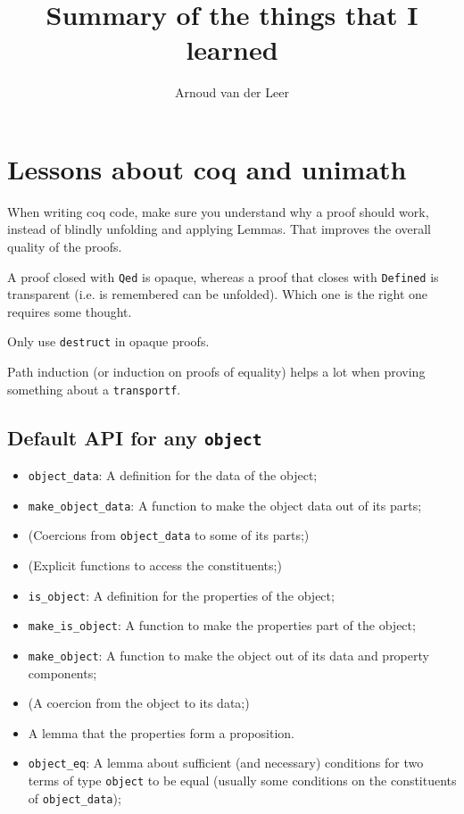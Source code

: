 \documentclass{amsbook}
\title{Summary of the things that I learned}
\author{Arnoud van der Leer}
\begin{document}
  \maketitle

  \chapter{Lessons about coq and unimath}
  When writing coq code, make sure you understand why a proof should work, instead of blindly unfolding and applying Lemmas. That improves the overall quality of the proofs.

  A proof closed with \texttt{Qed} is opaque, whereas a proof that closes with \texttt{Defined} is transparent (i.e. is remembered can be unfolded). Which one is the right one requires some thought.

  Only use \texttt{destruct} in opaque proofs.

  Path induction (or induction on proofs of equality) helps a lot when proving something about a \texttt{transportf}.

  \section{Default API for any \texttt{object}}
  \begin{itemize}
    \item \texttt{object\_data}: A definition for the data of the object;
    \item \texttt{make\_object\_data}: A function to make the object data out of its parts;
    \item (Coercions from \texttt{object\_data} to some of its parts;)
    \item (Explicit functions to access the constituents;)
    \item \texttt{is\_object}: A definition for the properties of the object;
    \item \texttt{make\_is\_object}: A function to make the properties part of the object;
    \item \texttt{make\_object}: A function to make the object out of its data and property components;
    \item (A coercion from the object to its data;)
    \item A lemma that the properties form a proposition.
    \item \texttt{object\_eq}: A lemma about sufficient (and necessary) conditions for two terms of type \texttt{object} to be equal (usually some conditions on the constituents of \texttt{object\_data});
  \end{itemize}
\end{document}
